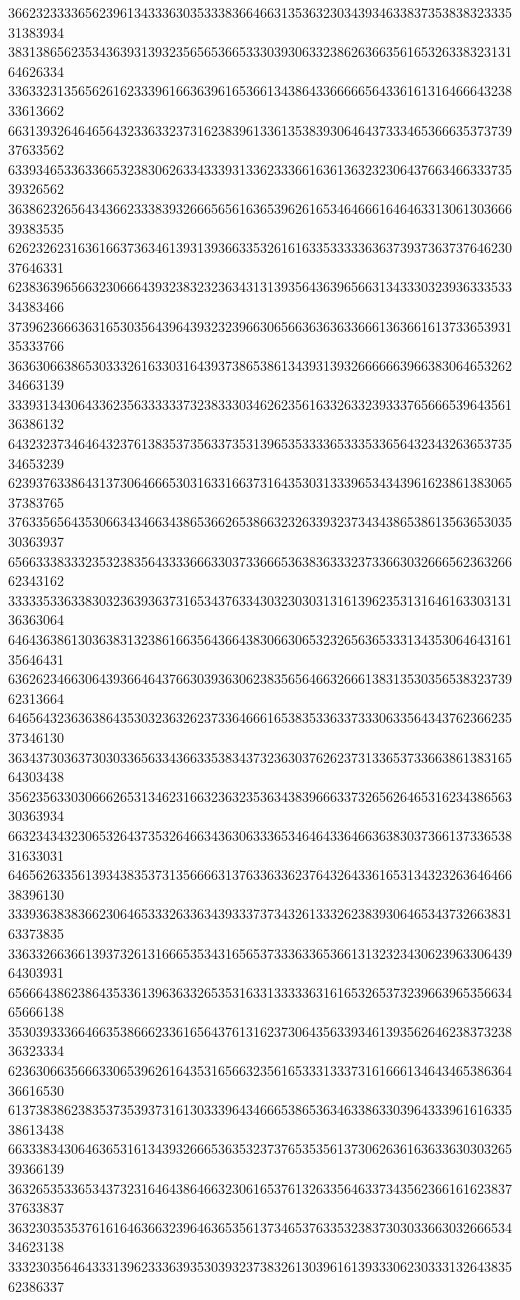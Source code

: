 36623233336562396134333630353338366466313536323034393463383735383832333531383934
38313865623534363931393235656536653330393063323862636635616532633832313164626334
33633231356562616233396166363961653661343864336666656433616131646664323833613662
66313932646465643233633237316238396133613538393064643733346536663537373937633562
63393465336336653238306263343339313362333661636136323230643766346633373539326562
36386232656434366233383932666565616365396261653464666164646331306130366639383535
62623262316361663736346139313936633532616163353333363637393736373764623037646331
62383639656632306664393238323236343131393564363965663134333032393633353334383466
37396236663631653035643964393232396630656636363633666136366161373365393135333766
36363066386530333261633031643937386538613439313932666666396638306465326234663139
33393134306433623563333337323833303462623561633263323933376566653964356136386132
64323237346464323761383537356337353139653533336533353365643234326365373534653239
62393763386431373064666530316331663731643530313339653434396162386138306537383765
37633565643530663434663438653662653866323263393237343438653861356365303530363937
65663338333235323835643333666330373366653638363332373366303266656236326662343162
33333533633830323639363731653437633430323030313161396235313164616330313136363064
64643638613036383132386166356436643830663065323265636533313435306464316135646431
63626234663064393664643766303936306238356564663266613831353035653832373962313664
64656432363638643530323632623733646661653835336337333063356434376236623537346130
36343730363730303365633436633538343732363037626237313365373366386138316564303438
35623563303066626531346231663236323536343839666337326562646531623438656330363934
66323434323065326437353264663436306333653464643364663638303736613733653831633031
64656263356139343835373135666631376336336237643264336165313432326364646638396130
33393638383662306465333263363439333737343261333262383930646534373266383163373835
33633266366139373261316665353431656537333633653661313232343062396330643964303931
65666438623864353361396363326535316331333336316165326537323966396535663465666138
35303933366466353866623361656437613162373064356339346139356264623837323836323334
62363066356663306539626164353165663235616533313337316166613464346538636436616530
61373838623835373539373161303339643466653865363463386330396433396161633538613438
66333834306463653161343932666536353237376535356137306263616363363030326539366139
36326535336534373231646438646632306165376132633564633734356236616162383737633837
36323035353761616463663239646365356137346537633532383730303366303266653434623138
33323035646433313962333639353039323738326130396161393330623033313264383562386337
